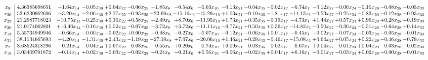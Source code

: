 \documentclass[9pt]{article}
\begin{document}
 \[\begin{array}{c| c c@{\hskip 2pt} c@{\hskip 2pt} c@{\hskip 2pt} c@{\hskip 2pt} c@{\hskip 2pt} c@{\hskip 2pt} c@{\hskip 2pt} c@{\hskip 2pt} c@{\hskip 2pt} c@{\hskip 2pt} c@{\hskip 2pt} c@{\hskip 2pt} c@{\hskip 2pt} c@{\hskip 2pt} c@{\hskip 2pt} c@{\hskip 2pt} }
 x_{9}   &  4.36385698651 & +  1.64 x_{14} & -0.05 x_{30} & +  0.04 x_{22} & -0.06 x_{25} & -1.85 x_{8} & -0.54 x_{6} & -0.03 x_{10} & -0.13 x_{21} & -0.04 x_{35} & -0.02 x_{17} & -0.74 x_{1} & -0.12 x_{27} & -0.06 x_{24} & -0.10 x_{29} & -0.08 x_{28} & -0.03 x_{33}\\
 x_{26}   &  53.6230962606 & +  3.20 x_{14} & -2.06 x_{30} & +  2.77 x_{22} & -0.93 x_{25} & -23.09 x_{8} & -15.16 x_{6} & -45.29 x_{10} & +  1.03 x_{21} & -0.19 x_{35} & -1.81 x_{17} & -14.13 x_{1} & -0.53 x_{27} & -0.25 x_{24} & -0.83 x_{29} & -0.12 x_{28} & -0.93 x_{33}\\
 x_{23}   &  21.2987718023 & -10.75 x_{14} & -0.25 x_{30} & +  0.10 x_{22} & +  0.58 x_{25} & +  2.49 x_{8} & +  8.70 x_{6} & -11.95 x_{10} & +  1.73 x_{21} & +  0.35 x_{35} & -0.19 x_{17} & -4.73 x_{1} & +  1.44 x_{27} & +  0.57 x_{24} & +  0.99 x_{29} & +  0.28 x_{28} & +  0.19 x_{33}\\
 x_{20}   &  21.0174062801 & + 16.46 x_{14} & -0.16 x_{30} & +  0.52 x_{22} & -0.07 x_{25} & -3.72 x_{8} & +  3.72 x_{6} & -11.11 x_{10} & -0.77 x_{21} & +  0.50 x_{35} & +  0.36 x_{17} & -14.82 x_{1} & -0.50 x_{27} & -0.36 x_{24} & -0.51 x_{29} & -0.64 x_{28} & +  0.14 x_{33}\\
 x_{13}   &  5.55734949946 & +  0.66 x_{14} & -0.00 x_{30} & -0.02 x_{22} & +  0.00 x_{25} & -0.48 x_{8} & -0.27 x_{6} & -0.07 x_{10} & -0.12 x_{21} & -0.06 x_{35} & +  0.01 x_{17} & -0.45 x_{1} & -0.02 x_{27} & -0.07 x_{24} & -0.03 x_{29} & -0.05 x_{28} & -0.01 x_{33}\\
 x_{31}   &  38.1134665693 & +  4.20 x_{14} & -1.31 x_{30} & +  2.43 x_{22} & -1.19 x_{25} & -27.19 x_{8} & +  7.07 x_{6} & -20.06 x_{10} & +  1.46 x_{21} & +  0.29 x_{35} & -0.46 x_{17} & -15.08 x_{1} & +  0.64 x_{27} & +  0.05 x_{24} & +  0.22 x_{29} & -0.46 x_{28} & -0.79 x_{33}\\
 x_{2}   &  3.68524318296 & -0.21 x_{14} & -0.04 x_{30} & +  0.07 x_{22} & -0.03 x_{25} & -0.55 x_{8} & +  0.20 x_{6} & -0.74 x_{10} & +  0.09 x_{21} & -0.03 x_{35} & -0.02 x_{17} & -0.67 x_{1} & +  0.04 x_{27} & -0.01 x_{24} & +  0.04 x_{29} & -0.03 x_{28} & -0.02 x_{33}\\
 x_{15}   &  3.03409791872 & +  0.14 x_{14} & +  0.02 x_{30} & -0.03 x_{22} & -0.02 x_{25} & +  0.24 x_{8} & -0.21 x_{6} & +  0.56 x_{10} & -0.06 x_{21} & -0.02 x_{35} & +  0.04 x_{17} & +  0.16 x_{1} & -0.01 x_{27} & -0.03 x_{24} & +  0.02 x_{29} & -0.00 x_{28} & -0.01 x_{33}\\

\end{array}\]
\end{document}

